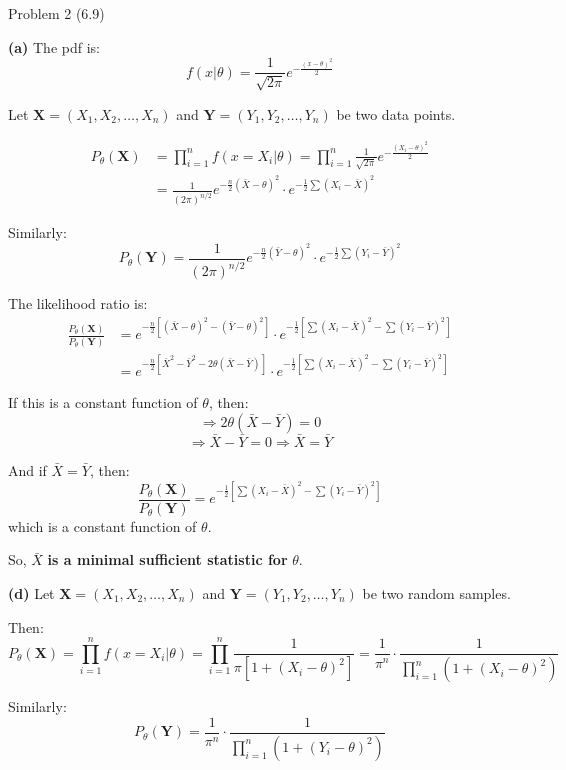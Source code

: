 \documentclass[12pt,a4paper,onecolumn]{exam}
\newcommand{\questionheader}[1]{%
  \begin{tcolorbox}[
    enhanced,
    colback=black,
    coltext=white,
    boxrule=0pt,
    fontupper=\Large\bfseries,
    arc=4mm
  ]
  #1
  \end{tcolorbox}%
}
\begin{document}
\questionheader{Problem 2 (6.9)}

\begin{solution}
\textbf{(a)} The pdf is:
\[
f(x|\theta) = \frac{1}{\sqrt{2\pi}} e^{-\frac{(x-\theta)^2}{2}}
\]

Let $\mathbf{X} = (X_1, X_2, \ldots, X_n)$ and $\mathbf{Y} = (Y_1, Y_2, \ldots, Y_n)$ be two data points.

\begin{align*}
P_{\theta}(\mathbf{X}) &= \prod_{i=1}^{n} f(x = X_i | \theta) = \prod_{i=1}^{n} \frac{1}{\sqrt{2\pi}} e^{-\frac{(X_i - \theta)^2}{2}} \\
&= \frac{1}{(2\pi)^{n/2}} e^{-\frac{n}{2}(\bar{X} - \theta)^2} \cdot e^{-\frac{1}{2}\sum(X_i - \bar{X})^2}
\end{align*}

Similarly:
\[
P_{\theta}(\mathbf{Y}) = \frac{1}{(2\pi)^{n/2}} e^{-\frac{n}{2}(\bar{Y} - \theta)^2} \cdot e^{-\frac{1}{2}\sum(Y_i - \bar{Y})^2}
\]

The likelihood ratio is:
\begin{align*}
\frac{P_{\theta}(\mathbf{X})}{P_{\theta}(\mathbf{Y})} &= e^{-\frac{n}{2}[(\bar{X}-\theta)^2 - (\bar{Y}-\theta)^2]} \cdot e^{-\frac{1}{2}[\sum(X_i-\bar{X})^2 - \sum(Y_i-\bar{Y})^2]} \\
&= e^{-\frac{n}{2}[\bar{X}^2 - \bar{Y}^2 - 2\theta(\bar{X}-\bar{Y})]} \cdot e^{-\frac{1}{2}[\sum(X_i-\bar{X})^2 - \sum(Y_i-\bar{Y})^2]}
\end{align*}

If this is a constant function of $\theta$, then:
\[
\Rightarrow 2\theta(\bar{X} - \bar{Y}) = 0 
\]
\[
\Rightarrow \bar{X} - \bar{Y} = 0 \Rightarrow \bar{X} = \bar{Y}
\]

And if $\bar{X} = \bar{Y}$, then:
\[
\frac{P_{\theta}(\mathbf{X})}{P_{\theta}(\mathbf{Y})} = e^{-\frac{1}{2}[\sum(X_i-\bar{X})^2 - \sum(Y_i-\bar{Y})^2]}
\]
which is a constant function of $\theta$.

So, $\boxed{\bar{X}}$ \textbf{is a minimal sufficient statistic for} $\theta$.

\vspace{1em}
\textbf{(d)} Let $\mathbf{X} = (X_1, X_2, \ldots, X_n)$ and $\mathbf{Y} = (Y_1, Y_2, \ldots, Y_n)$ be two random samples.

Then:
\[
P_{\theta}(\mathbf{X}) = \prod_{i=1}^{n} f(x = X_i | \theta) = \prod_{i=1}^{n} \frac{1}{\pi[1 + (X_i - \theta)^2]} = \frac{1}{\pi^n} \cdot \frac{1}{\prod_{i=1}^{n}(1 + (X_i - \theta)^2)}
\]

Similarly:
\[
P_{\theta}(\mathbf{Y}) = \frac{1}{\pi^n} \cdot \frac{1}{\prod_{i=1}^{n}(1 + (Y_i - \theta)^2)}
\]


\end{solution}
\end{document}
